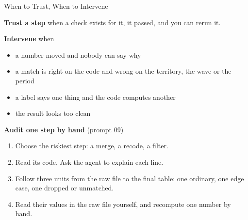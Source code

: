 \documentclass[svgnames,x11names,dvipsnames]{beamer}
\begin{document}
\begin{frame}{When to Trust, When to Intervene}

\small
\textbf{Trust a step} when a check exists for it, it passed, and you can rerun it.

\vspace{0.2cm}

\textbf{Intervene} when
\begin{itemize}
    \setlength{\itemsep}{1pt}
    \item a number moved and nobody can say why
    \item a match is right on the code and wrong on the territory, the wave or the period
    \item a label says one thing and the code computes another
    \item the result looks too clean
\end{itemize}

\vspace{0.3cm}

\textbf{Audit one step by hand} (prompt 09)
\begin{enumerate}
    \setlength{\itemsep}{1pt}
    \item Choose the riskiest step: a merge, a recode, a filter.
    \item Read its code. Ask the agent to explain each line.
    \item Follow three units from the raw file to the final table: one ordinary, one edge case, one dropped or unmatched.
    \item Read their values in the raw file yourself, and recompute one number by hand.
\end{enumerate}

\end{frame}
\end{document}
